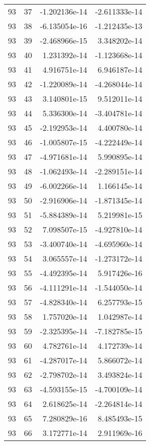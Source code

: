 \begin{tabular}{rrrr}
  93 &   37 & -1.202136e-14 & -2.611333e-14 \\
  93 &   38 & -6.135054e-16 & -1.212435e-13 \\
  93 &   39 & -2.468966e-15 &  3.348202e-14 \\
  93 &   40 &  1.231392e-14 & -1.123668e-14 \\
  93 &   41 &  4.916751e-14 &  6.946187e-14 \\
  93 &   42 & -1.220089e-14 & -4.268044e-14 \\
  93 &   43 &  3.140801e-15 &  9.512011e-14 \\
  93 &   44 &  5.336300e-14 & -3.404781e-14 \\
  93 &   45 & -2.192953e-14 &  4.400780e-14 \\
  93 &   46 & -1.005807e-15 & -4.222449e-14 \\
  93 &   47 & -4.971681e-14 &  5.990895e-14 \\
  93 &   48 & -1.062493e-14 & -2.289151e-14 \\
  93 &   49 & -6.002266e-14 &  1.166145e-14 \\
  93 &   50 & -2.916906e-14 & -1.871345e-14 \\
  93 &   51 & -5.884389e-14 &  5.219981e-15 \\
  93 &   52 &  7.098507e-15 & -4.927810e-14 \\
  93 &   53 & -3.400740e-14 & -4.695960e-14 \\
  93 &   54 &  3.065557e-14 & -1.273172e-14 \\
  93 &   55 & -4.492395e-14 &  5.917426e-16 \\
  93 &   56 & -4.111291e-14 & -1.544050e-14 \\
  93 &   57 & -4.828340e-14 &  6.257793e-15 \\
  93 &   58 &  1.757020e-14 &  1.042987e-14 \\
  93 &   59 & -2.325395e-14 & -7.182785e-15 \\
  93 &   60 &  4.782761e-14 &  4.172739e-14 \\
  93 &   61 & -4.287017e-14 &  5.866072e-14 \\
  93 &   62 & -2.798702e-14 &  3.493824e-14 \\
  93 &   63 & -4.593155e-15 & -4.700109e-14 \\
  93 &   64 &  2.618625e-14 & -2.264814e-14 \\
  93 &   65 &  7.280829e-16 &  8.485493e-15 \\
  93 &   66 &  3.172771e-14 &  2.911969e-16 \\

\end{tabular}
